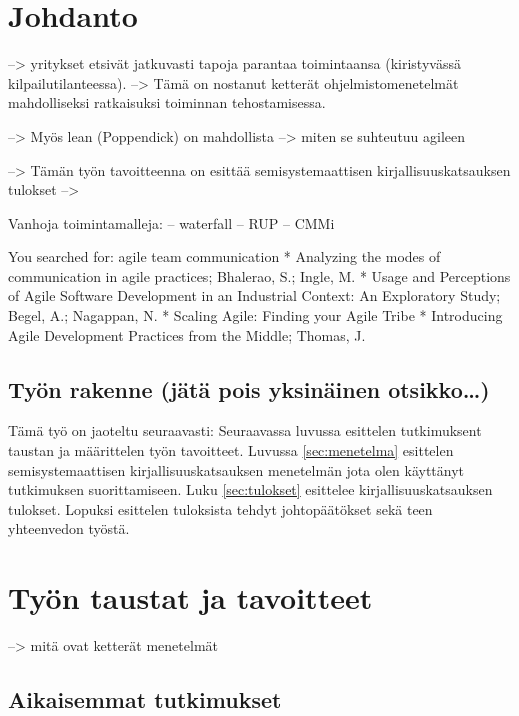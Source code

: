 
\section{Johdanto}

--> yritykset etsivät jatkuvasti tapoja parantaa toimintaansa (kiristyvässä
kilpailutilanteessa). --> Tämä on nostanut ketterät ohjelmistomenetelmät
mahdolliseksi ratkaisuksi toiminnan tehostamisessa.

--> Myös lean (Poppendick) on mahdollista --> miten se suhteutuu agileen

--> Tämän työn tavoitteenna on esittää semisystemaattisen kirjallisuuskatsauksen
tulokset -->


Vanhoja toimintamalleja:
-- waterfall
-- RUP
-- CMMi


You searched for: agile team communication
* Analyzing the modes of communication in agile practices; Bhalerao, S.; Ingle, M.
* Usage and Perceptions of Agile Software Development in an Industrial Context: An Exploratory Study; Begel, A.; Nagappan, N.
* Scaling Agile: Finding your Agile Tribe
* Introducing Agile Development Practices from the Middle; Thomas, J.

\subsection{Työn rakenne (jätä pois yksinäinen otsikko\ldots)}

Tämä työ on jaoteltu seuraavasti:
Seuraavassa luvussa esittelen tutkimuksent taustan ja määrittelen työn
tavoitteet. Luvussa \ref{sec:menetelma} esittelen semisystemaattisen
kirjallisuuskatsauksen menetelmän jota olen käyttänyt tutkimuksen
suorittamiseen. Luku \ref{sec:tulokset} esittelee kirjallisuuskatsauksen
tulokset. Lopuksi esittelen tuloksista tehdyt johtopäätökset sekä teen
yhteenvedon työstä.



\section{Työn taustat ja tavoitteet}
\label{sec:tausta}

--> mitä ovat ketterät menetelmät


\subsection{Aikaisemmat tutkimukset}

